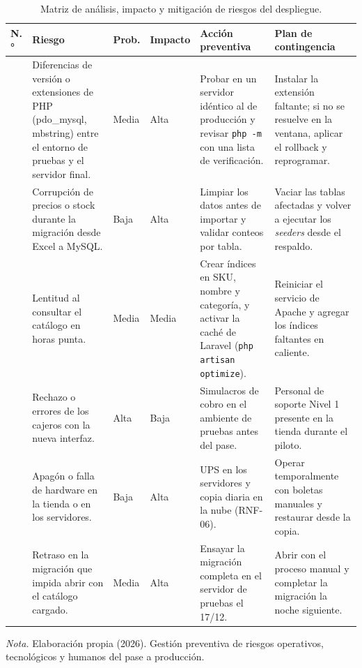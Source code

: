 \begin{table}[H]
  \centering
  \small
  \caption{Matriz de análisis, impacto y mitigación de riesgos del despliegue.}
  \label{tab:despliegue_riesgos}
  \begin{tabularx}{\linewidth}{|>{\centering\arraybackslash}p{0.7cm}|>{\raggedright\arraybackslash}X|>{\centering\arraybackslash}p{1.4cm}|>{\centering\arraybackslash}p{1.7cm}|>{\raggedright\arraybackslash}X|>{\raggedright\arraybackslash}X|}
    \hline
    \textbf{N.°} & \textbf{Riesgo} & \textbf{Prob.} & \textbf{Impacto} & \textbf{Acción preventiva} & \textbf{Plan de contingencia} \\ \hline
    1 & Diferencias de versión o extensiones de PHP (pdo\_mysql, mbstring) entre el entorno de pruebas y el servidor final. & Media & Alta & Probar en un servidor idéntico al de producción y revisar \texttt{php -m} con una lista de verificación. & Instalar la extensión faltante; si no se resuelve en la ventana, aplicar el rollback y reprogramar. \\ \hline
    2 & Corrupción de precios o stock durante la migración desde Excel a MySQL. & Baja & Alta & Limpiar los datos antes de importar y validar conteos por tabla. & Vaciar las tablas afectadas y volver a ejecutar los \emph{seeders} desde el respaldo. \\ \hline
    3 & Lentitud al consultar el catálogo en horas punta. & Media & Media & Crear índices en SKU, nombre y categoría, y activar la caché de Laravel (\texttt{php artisan optimize}). & Reiniciar el servicio de Apache y agregar los índices faltantes en caliente. \\ \hline
    4 & Rechazo o errores de los cajeros con la nueva interfaz. & Alta & Baja & Simulacros de cobro en el ambiente de pruebas antes del pase. & Personal de soporte Nivel 1 presente en la tienda durante el piloto. \\ \hline
    5 & Apagón o falla de hardware en la tienda o en los servidores. & Baja & Alta & UPS en los servidores y copia diaria en la nube (RNF-06). & Operar temporalmente con boletas manuales y restaurar desde la copia. \\ \hline
    6 & Retraso en la migración que impida abrir con el catálogo cargado. & Media & Alta & Ensayar la migración completa en el servidor de pruebas el 17/12. & Abrir con el proceso manual y completar la migración la noche siguiente. \\ \hline
  \end{tabularx}
  \par\vspace{0.2cm}
  {\raggedright \small \emph{Nota.} Elaboración propia (2026). Gestión preventiva de riesgos operativos, tecnológicos y humanos del pase a producción.\par}
\end{table}

